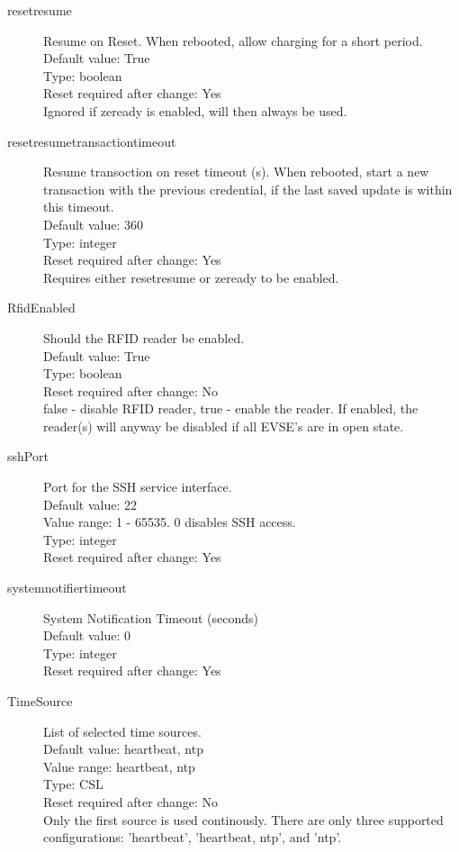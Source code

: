 \begin{description}
\item[resetresume] Resume on Reset. When rebooted, allow charging for a short period.\\
  Default value: True\\
  Type: boolean\\
  Reset required after change: Yes\\
  Ignored if zeready is enabled, will then always be used.\\

\item[resetresumetransactiontimeout] Resume transoction on reset timeout (s). When rebooted, start a new transaction with the previous credential, if the last saved update is within this timeout.\\
  Default value: 360\\
  Type: integer\\
  Reset required after change: Yes\\
  Requires either resetresume or zeready to be enabled.\\

\item[RfidEnabled] Should the RFID reader be enabled.\\
  Default value: True\\
  Type: boolean\\
  Reset required after change: No\\
  false - disable RFID reader, true - enable the reader. If enabled, the reader(s) will anyway be disabled if all EVSE's are in open state.\\

\item[sshPort] Port for the SSH service interface.\\
  Default value: 22\\
  Value range: 1 - 65535. 0 disables SSH access.\\
  Type: integer\\
  Reset required after change: Yes\\

\item[systemnotifiertimeout] System Notification Timeout (seconds)\\
  Default value: 0\\
  Type: integer\\
  Reset required after change: Yes\\

\item[TimeSource] List of selected time sources.\\
  Default value: heartbeat, ntp\\
  Value range: heartbeat, ntp\\
  Type: CSL\\
  Reset required after change: No\\
  Only the first source is used continously. There are only three supported configurations: 'heartbeat', 'heartbeat, ntp', and 'ntp'.\\


\end{description}
